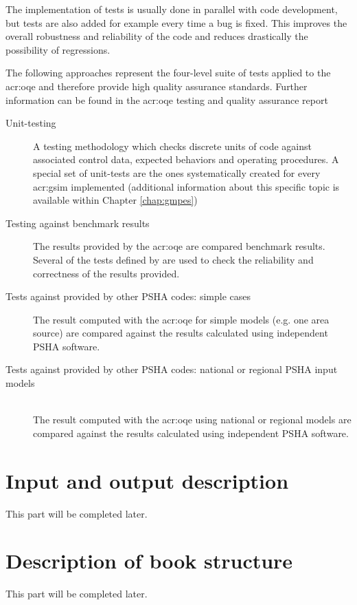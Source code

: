 The implementation of tests is usually done in parallel with code development,
but tests are also added for example every time a bug is fixed.
%
This improves the overall robustness and reliability of the code and reduces
drastically the possibility of regressions.

The following approaches represent the four-level suite of tests applied to the
\gls{acr:oqe} and therefore provide high quality assurance standards. Further
information can be found in the \gls{acr:oqe} testing and quality assurance
report \citep{pagani2014_oqtesting} 
%
\begin{description}
    \item [Unit-testing] A testing methodology which checks discrete 
        units of code against associated control data, expected behaviors 
        and operating procedures. A special set of unit-tests are the ones
        systematically created for every \gls{acr:gsim} implemented 
        (additional information about this specific topic is available within 
        Chapter \ref{chap:gmpes})
    \item [Testing against benchmark results] The results provided by the 
        \gls{acr:oqe} are compared benchmark results. Several of the 
        tests defined by \textcite{thomas2010} are used to check the 
        reliability and correctness of the results provided. 
    \item [Tests against provided by other PSHA codes: simple cases] 
        The result computed with the \gls{acr:oqe} for simple models (e.g. one
        area source) are compared against the results calculated using 
        independent PSHA software.
    \item [Tests against provided by other PSHA codes: national or regional 
        PSHA input models] \hfill \\ The result computed with the \gls{acr:oqe} 
        using national or regional models are compared against the 
        results calculated using independent PSHA software.
\end{description}
%
\section{Input and output description}
This part will be completed later.
%
\section{Description of book structure}
This part will be completed later.
